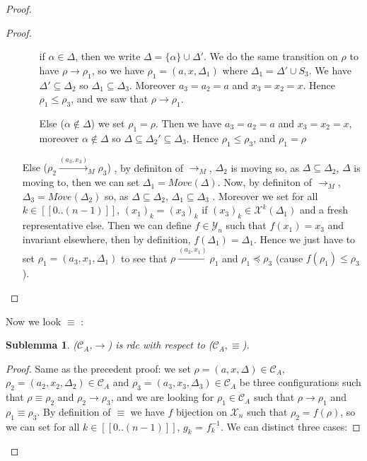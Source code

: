 \documentclass[a4paper,10pt]{report}
\newtheorem{slm}{Sublemma}[lm]
\newcommand{\seg}[1]{[\![#1]\!]}
\newcommand{\ts}{\seg{0 .. (n-1)}}
\newcommand{\C}{\mathcal{C}_{A}}
\newcommand{\Xa}{\mathcal{X}}
\newcommand{\X}{\mathcal{X}_{n}}
\newcommand{\Y}{\mathcal{Y}_{n}}
\begin{document}
\begin{proof}
\begin{proof}
\begin{itemize}
      \begin{itemize}
	\item [if $\alpha \in \Delta$,] then we write $\Delta = \{\alpha \} \cup \Delta'$.  
	We do the same transition on $\rho$ to have $\rho \rightarrow \rho_1$, so we have $\rho_1 = (a,x,\Delta_1)$ where $\Delta_1 = \Delta' \cup S_3$. 
	We have $\Delta' \subseteq \Delta_2$ so $\Delta_1 \subseteq \Delta_3$.
	Moreover $a_3= a_2 = a$ and $x_3 = x_2 = x$.
	Hence $\rho_1 \leq \rho_3$, and we saw that $\rho \rightarrow \rho_1$.
	\item [Else ($\alpha \notin \Delta$)] we set $\rho_1 = \rho$. Then we have $a_3= a_2 = a$ and $x_3 = x_2 = x$, moreover $\alpha \notin \Delta $ so $\Delta \subseteq \Delta_2' \subseteq \Delta_3$.
	Hence $\rho_1 \leq \rho_3$, and $\rho_1 = \rho$ 
      \end{itemize}
     \item [Else ($\rho_2 \xrightarrow{(a_3,x_3)}_{M} \rho_3$)],  
     by definiton of $\rightarrow_{M}$, $\Delta_2$ is moving so, as $\Delta \subseteq \Delta_2$, $\Delta$ is moving to, then we can set $\Delta_1 = Move(\Delta)$.
     Now, by definiton of $\rightarrow_{M}$, $\Delta_3 = Move(\Delta_2)$ so,
     as $\Delta \subseteq \Delta_2$, $\Delta_1 \subseteq \Delta_3$ .
     Moreover we set for all $k \in \ts$, ${(x_1)}_k = {(x_3)}_k$ if ${(x_3)}_k \in \Xa^k(\Delta_1)$ and a fresh representative else.
     Then we can define $f \in \Y$ such that $f(x_1) = x_3$ and invariant elsewhere, then by definition, $f(\Delta_1) = \Delta_1$.
     Hence we just have to set $\rho_1 = (a_3,x_1,\Delta_1)$ to see that $\rho \xrightarrow{(a_3,x_1)} \rho_1$ and $\rho_1 \preceq \rho_3$ (cause $f(\rho_1) \leq \rho_3$).
    \end{itemize}   
  \end{proof}
  Now we look $\equiv$ :
  \begin{slm}
    ($\C$,$\rightarrow$) is rdc with respect to ($\C,\equiv$).
  \end{slm}
  \begin{proof}
    Same as the precedent proof: we set $\rho = (a,x,\Delta) \in \C$, $\rho_2 = (a_2,x_2,\Delta_2) \in \C$ and $\rho_3 = (a_3,x_3,\Delta_3) \in \C$ be three configurations
   such that $\rho \equiv \rho_2$ and $\rho_2 \rightarrow \rho_3$, and we are looking for $\rho_1 \in \C$ such that $\rho \rightarrow \rho_1$  and $\rho_1 \equiv \rho_3$.
   By definition of $\equiv$ we have $f$ bijection on $\X$ such that $\rho_2 = f(\rho)$, so we can set for all $k \in \ts$, $g_k$ = $f_k^{-1}$.
   We can distinct three cases:

\end{proof}
\end{proof}
\end{document}
